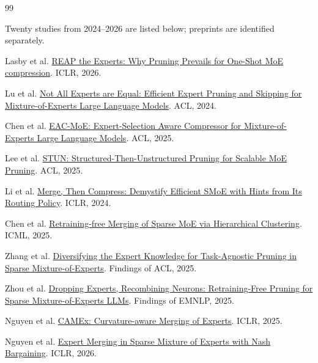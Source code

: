 \documentclass{article}
\begin{document}
\begin{thebibliography}{99}
\item[] Twenty studies from 2024--2026 are listed below; preprints are identified separately.

Lasby et al. \href{https://proceedings.iclr.cc/paper_files/paper/2026/hash/ed93b2b5722acc2341d421b8916404a1-Abstract-Conference.html}{REAP the Experts: Why Pruning Prevails for One-Shot MoE compression}. ICLR, 2026.

Lu et al. \href{https://aclanthology.org/2024.acl-long.334/}{Not All Experts are Equal: Efficient Expert Pruning and Skipping for Mixture-of-Experts Large Language Models}. ACL, 2024.

Chen et al. \href{https://aclanthology.org/2025.acl-long.633/}{EAC-MoE: Expert-Selection Aware Compressor for Mixture-of-Experts Large Language Models}. ACL, 2025.

Lee et al. \href{https://aclanthology.org/2025.acl-long.671/}{STUN: Structured-Then-Unstructured Pruning for Scalable MoE Pruning}. ACL, 2025.

Li et al. \href{https://proceedings.iclr.cc/paper_files/paper/2024/hash/3d09a88c3372cdb79401fde592ca4db8-Abstract-Conference.html}{Merge, Then Compress: Demystify Efficient SMoE with Hints from Its Routing Policy}. ICLR, 2024.

Chen et al. \href{https://proceedings.mlr.press/v267/chen25aq.html}{Retraining-free Merging of Sparse MoE via Hierarchical Clustering}. ICML, 2025.

Zhang et al. \href{https://aclanthology.org/2025.findings-acl.4/}{Diversifying the Expert Knowledge for Task-Agnostic Pruning in Sparse Mixture-of-Experts}. Findings of ACL, 2025.

Zhou et al. \href{https://aclanthology.org/2025.findings-emnlp.820/}{Dropping Experts, Recombining Neurons: Retraining-Free Pruning for Sparse Mixture-of-Experts LLMs}. Findings of EMNLP, 2025.

Nguyen et al. \href{https://proceedings.iclr.cc/paper_files/paper/2025/hash/341d64b067e06c6ebea97a498c90d598-Abstract-Conference.html}{CAMEx: Curvature-aware Merging of Experts}. ICLR, 2025.

Nguyen et al. \href{https://proceedings.iclr.cc/paper_files/paper/2026/hash/ef9f16cd0cb8d7797ea35c0ee7964cdf-Abstract-Conference.html}{Expert Merging in Sparse Mixture of Experts with Nash Bargaining}. ICLR, 2026.


\end{thebibliography}
\end{document}
